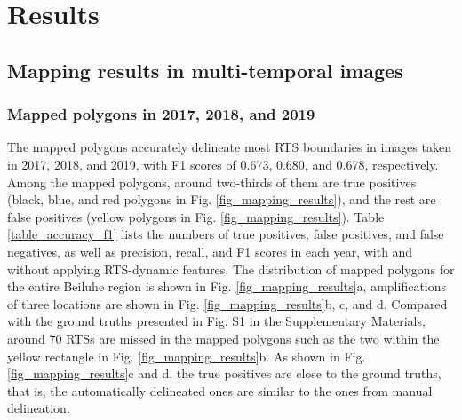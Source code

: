 \documentclass[authoryear,preprint,review,12pt]{elsarticle}
\begin{document}
\section{Results}
\label{sec_result}

\subsection{Mapping results in multi-temporal images}
\label{sec_mapping_performance}

\subsubsection{Mapped polygons in 2017, 2018, and 2019}
\label{sec_mapped_polygons}

The mapped polygons accurately delineate most RTS boundaries in images taken in 2017, 2018, and 2019, with F1 scores of 0.673, 0.680, and 0.678, respectively.
Among the mapped polygons, around two-thirds of them are true positives (black, blue, and red polygons in Fig. \ref{fig_mapping_results}), and the rest are false positives (yellow polygons in Fig. \ref{fig_mapping_results}). 
Table \ref{table_accuracy_f1} lists the numbers of true positives, false positives, and false negatives, as well as precision, recall, and F1 scores in each year, with and without applying RTS-dynamic features.
The distribution of mapped polygons for the entire Beiluhe region is shown in Fig. \ref{fig_mapping_results}a, amplifications of three locations are shown in Fig. \ref{fig_mapping_results}b, c, and d. 
Compared with the ground truths presented in Fig. S1 in the Supplementary Materials,  around 70 RTSs are missed in the mapped polygons such as the two within the yellow rectangle in Fig. \ref{fig_mapping_results}b.
As shown in Fig. \ref{fig_mapping_results}c and d, the true positives are close to the ground truths, that is, the automatically delineated ones are similar to the ones from manual delineation. 

\end{document}
